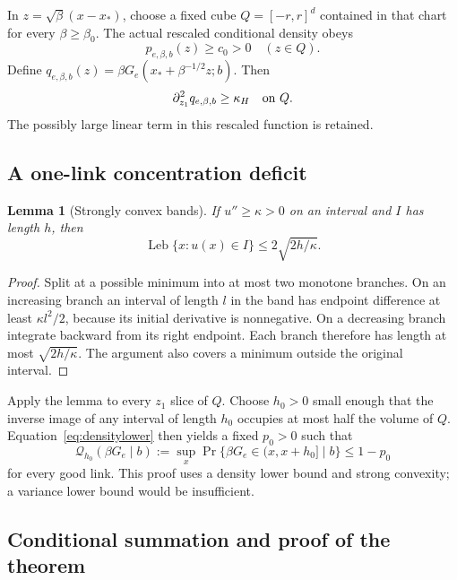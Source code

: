 \documentclass[11pt,letterpaper]{article}
\numberwithin{equation}{section}
\theoremstyle{plain}
\newtheorem{lemma}[theorem]{Lemma}
\theoremstyle{remark}
\begin{document}
In $z=\sqrt\beta(x-x_*)$, choose a fixed cube $Q=[-r,r]^d$ contained in that
chart for every $\beta\ge\beta_0$. The actual rescaled conditional density obeys
\begin{equation}
 p_{e,\beta,b}(z)\ge c_0>0\quad(z\in Q).
 \label{eq:densitylower}
\end{equation}
Define $q_{e,\beta,b}(z)=\beta G_e(x_*+\beta^{-1/2}z;b)$. Then
\begin{equation}
 \partial_{z_1}^2q_{e,\beta,b}\ge\kappa_H\quad\hbox{on }Q.
 \label{eq:qhessian}
\end{equation}
The possibly large linear term in this rescaled function is retained.

\subsection{A one-link concentration deficit}

\begin{lemma}[Strongly convex bands]
\label{lem:band}
If $u''\ge\kappa>0$ on an interval and $I$ has length $h$, then
\[
 \operatorname{Leb}\{x:u(x)\in I\}\le2\sqrt{2h/\kappa}.
\]
\end{lemma}
\begin{proof}
Split at a possible minimum into at most two monotone branches. On an increasing
branch an interval of length $l$ in the band has endpoint difference at least
$\kappa l^2/2$, because its initial derivative is nonnegative. On a decreasing
branch integrate backward from its right endpoint. Each branch therefore has
length at most $\sqrt{2h/\kappa}$. The argument also covers a minimum outside
the original interval.
\end{proof}

Apply the lemma to every $z_1$ slice of $Q$. Choose $h_0>0$ small enough that the
inverse image of any interval of length $h_0$ occupies at most half the volume
of $Q$. Equation~\eqref{eq:densitylower} then yields a fixed $p_0>0$ such that
\begin{equation}
 \mathcal Q_{h_0}(\beta G_e\mid b)
 :=\sup_x\Pr\{\beta G_e\in(x,x+h_0]\mid b\}\le1-p_0
 \label{eq:deficit}
\end{equation}
for every good link. This proof uses a density lower bound and strong convexity;
a variance lower bound would be insufficient.

\subsection{Conditional summation and proof of the theorem}
\end{document}
